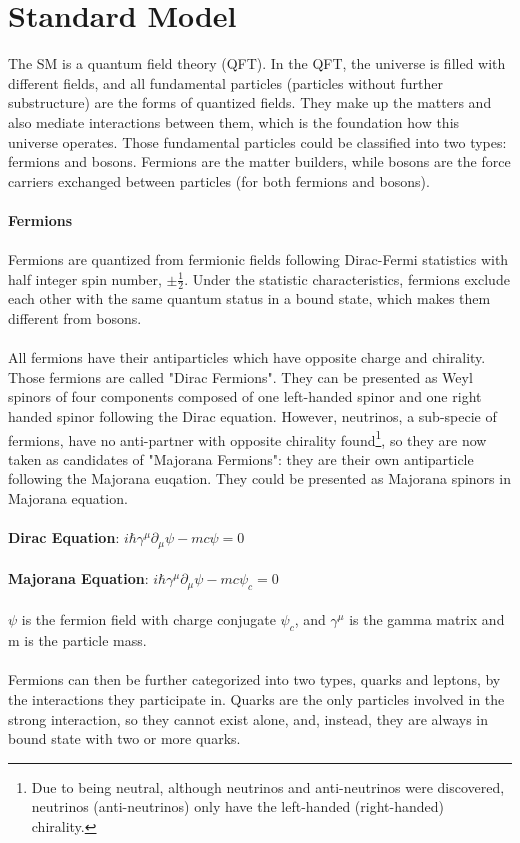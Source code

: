 \section{Standard Model\cite{Griffiths,Perkins}}
The SM is a quantum field theory (QFT). In the QFT, the universe is filled with different fields, and all fundamental particles (particles without further substructure) are the forms of quantized fields. They make up the matters and also mediate interactions between them, which is the foundation how this universe operates. Those fundamental particles could be classified into two types: fermions and bosons. Fermions are the matter builders, while bosons are the force carriers exchanged between particles (for both fermions and bosons). 
\\
\\{\bf Fermions}
\\
\\Fermions are quantized from fermionic fields following Dirac-Fermi statistics with half integer spin number, $\pm\frac{1}{2}$. Under the statistic characteristics, fermions exclude each other with the same quantum status in a bound state, which makes them different from bosons. \\
\\
All fermions have their antiparticles which have opposite charge and chirality. Those fermions are called "Dirac Fermions". They can be presented as Weyl spinors of four components composed of one left-handed spinor and one right handed spinor following the Dirac equation. However, neutrinos, a sub-specie of fermions, have no anti-partner with opposite chirality found\footnote{Due to being neutral, although neutrinos and anti-neutrinos were discovered, neutrinos (anti-neutrinos) only have the left-handed (right-handed) chirality.}, so they are now taken as candidates of "Majorana Fermions": they are their own antiparticle following the Majorana euqation. They could be presented as Majorana spinors in Majorana equation. 
\\
\\{\bf Dirac Equation}: $i\hbar\gamma^{\mu}\partial_{\mu}\psi-mc\psi=0$ 
\\
\\{\bf Majorana Equation}: $i\hbar\gamma^\mu\partial_\mu\psi-mc\psi_c=0$
\\
\\$\psi$ is the fermion field with charge conjugate $\psi_c$, and $\gamma^\mu$ is the gamma matrix and m is the particle mass.
\\ 
\\Fermions can then be further categorized into two types, quarks and leptons, by the interactions they participate in. Quarks are the only particles involved in the strong interaction, so they cannot exist alone, and, instead, they are always in bound state with two or more quarks. 
